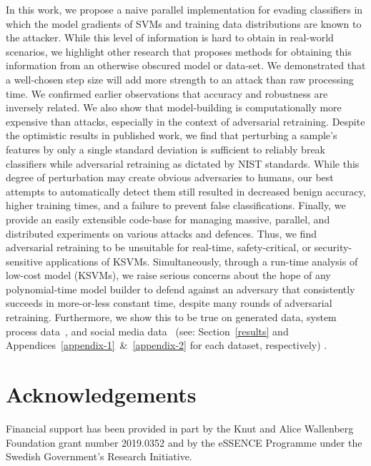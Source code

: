\documentclass[fonts]{icst}
\begin{document}
In this work, we propose a naive parallel implementation for evading classifiers in which the model gradients of SVMs and training data distributions are known to the attacker. While this level of information is hard to obtain in real-world scenarios, we highlight other research that proposes methods for obtaining this information from an otherwise obscured model or data-set. We demonstrated that a   well-chosen step size will add more strength to an attack than raw processing time. We confirmed earlier observations that accuracy and robustness are inversely related. We also show that model-building is computationally more expensive than attacks, especially in the context of adversarial retraining. Despite the optimistic results in published work, we find that perturbing a sample's features by only a single standard deviation is sufficient to reliably break classifiers while adversarial retraining as dictated by NIST standards\cite{falco2006using}. While this degree of perturbation may create obvious adversaries to humans, our best attempts to automatically detect them still resulted in decreased benign accuracy, higher training times, and a failure to prevent false classifications. Finally, we provide an easily extensible code-base for managing massive, parallel, and distributed experiments on various attacks and defences. Thus, we find adversarial retraining to be unsuitable for real-time, safety-critical, or security-sensitive applications of KSVMs. Simultaneously, through a run-time analysis of low-cost model (KSVMs), we raise serious concerns about the hope of any polynomial-time model builder to defend against an adversary that consistently succeeds in more-or-less constant time, despite many rounds of adversarial retraining. Furthermore, we show this to be true on generated data, system process data~\cite{kdd-nsl}, and social media data~\cite{truthseeker} (see: Section~\ref{results} and Appendices~\ref{appendix-1}~\&~\ref{appendix-2} for each dataset, respectively) .

\section{Acknowledgements}
Financial support has been provided in part by the Knut and Alice Wallenberg Foundation grant number 2019.0352 and by the eSSENCE Programme under the Swedish Government's Research Initiative.



\end{document}
